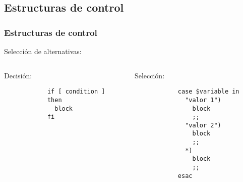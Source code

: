 \subsection{Estructuras de control}
\begin{frame}[fragile]
	\frametitle{Estructuras de control}
	\begin{block}{Selección de alternativas:}
	\begin{columns}
	    \begin{column}{.45\linewidth}
		Decisión:
	    	\begin{lstlisting}
			if [ condition ]
			then
			  block
			fi
		\end{lstlisting}
	    \end{column}
	    \begin{column}{.45\linewidth}
		Selección:
	    	\begin{lstlisting}
			case $variable in
			  "valor 1")
			    block
			    ;;
			  "valor 2")
			    block
			    ;;
			  *)
			    block
			    ;;
			esac
		\end{lstlisting}
	    \end{column}
	\end{columns}
	\end{block}
\end{frame}

